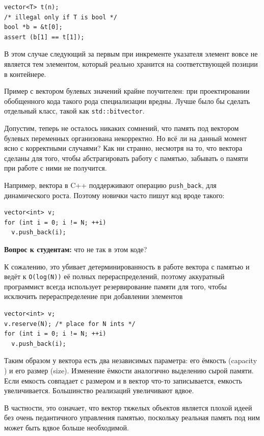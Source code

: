 \documentclass[a4paper,12pt,oneside]{article}
\newif\ifanswers
\begin{document}
\begin{lstlisting}
vector<T> t(n);
/* illegal only if T is bool */
bool *b = &t[0];
assert (b[1] == t[1]);
\end{lstlisting}

В этом случае следующий за первым при инкременте указателя элемент вовсе не является тем элементом, который реально хранится на соответствующей позиции в контейнере.

Пример с вектором булевых значений крайне поучителен: при проектировании обобщенного кода такого рода специализации вредны. Лучше было бы сделать отдельный класс, такой как \lstinline!std::bitvector!.

Допустим, теперь не осталось никаких сомнений, что память под вектором булевых переменных организована некорректно. Но всё ли на данный момент ясно с корректными случаями? Как ни странно, несмотря на то, что вектора сделаны для того, чтобы абстрагировать работу с памятью, забывать о памяти при работе с ними не получится.

Например, вектора в C++ поддерживают операцию \lstinline!push_back!, для динамического роста. Поэтому новички часто пишут код вроде такого:

\begin{lstlisting}
vector<int> v;
for (int i = 0; i != N; ++i)
  v.push_back(i);
\end{lstlisting}

\textbf{Вопрос к студентам:} что не так в этом коде?

\ifanswers
См. ответ далее в тексте лекций
\fi

К сожалению, это убивает детерминированность в работе вектора с памятью и ведёт к \lstinline!O(log(N))! её полных перераспределений, поэтому аккуратный программист всегда использует резервирование памяти для того, чтобы исключить перераспределение при добавлении элементов

\begin{lstlisting}
vector<int> v;
v.reserve(N); /* place for N ints */
for (int i = 0; i != N; ++i)
  v.push_back(i);
\end{lstlisting}

Таким образом у вектора есть два независимых параметра: его ёмкость (capacity ) и его размер (size). Изменение ёмкости аналогично выделению сырой памяти. Если емкость совпадает с размером и в вектор что-то записывается, емкость увеличивается. Большинство реализаций увеличивают вдвое.

В частности, это означает, что вектор тяжелых объектов является плохой идеей без очень педантичного управления памятью, поскольку реальная память под ним может быть вдвое больше необходимой. 
\end{document}
